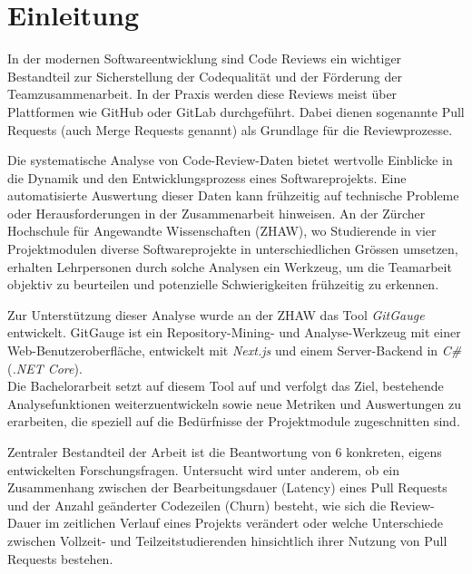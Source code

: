 


\chapter{Einleitung} %
In der modernen Softwareentwicklung sind Code Reviews ein wichtiger Bestandteil zur Sicherstellung der Codequalität und der Förderung der Teamzusammenarbeit. In der Praxis werden diese Reviews meist über Plattformen wie GitHub oder GitLab durchgeführt. Dabei dienen sogenannte Pull Requests (auch Merge Requests genannt) als Grundlage für die Reviewprozesse.

Die systematische Analyse von Code-Review-Daten bietet wertvolle Einblicke in die Dynamik und den Entwicklungsprozess eines Softwareprojekts. Eine automatisierte Auswertung dieser Daten kann frühzeitig auf technische Probleme oder Herausforderungen in der Zusammenarbeit hinweisen. An der Zürcher Hochschule für Angewandte Wissenschaften (ZHAW), wo Studierende in vier Projektmodulen diverse Softwareprojekte in unterschiedlichen Grössen umsetzen, erhalten Lehrpersonen durch solche Analysen ein Werkzeug, um die Teamarbeit objektiv zu beurteilen und potenzielle Schwierigkeiten frühzeitig zu erkennen.

Zur Unterstützung dieser Analyse wurde an der ZHAW das Tool \textit{GitGauge} entwickelt. GitGauge ist ein Repository-Mining- und Analyse-Werkzeug mit einer Web-Benutzeroberfläche, entwickelt mit \textit{Next.js} und einem Server-Backend in \textit{C\#} (\textit{.NET Core}).  \\
Die Bachelorarbeit setzt auf diesem Tool auf und verfolgt das Ziel, bestehende Analysefunktionen weiterzuentwickeln sowie neue Metriken und Auswertungen zu erarbeiten, die speziell auf die Bedürfnisse der Projektmodule zugeschnitten sind.

Zentraler Bestandteil der Arbeit ist die Beantwortung von 6 konkreten, eigens entwickelten Forschungsfragen. Untersucht wird unter anderem, ob ein Zusammenhang zwischen der Bearbeitungsdauer (Latency) eines Pull Requests und der Anzahl geänderter Codezeilen (Churn) besteht, wie sich die Review-Dauer im zeitlichen Verlauf eines Projekts verändert oder welche Unterschiede zwischen Vollzeit- und Teilzeitstudierenden hinsichtlich ihrer Nutzung von Pull Requests bestehen.

